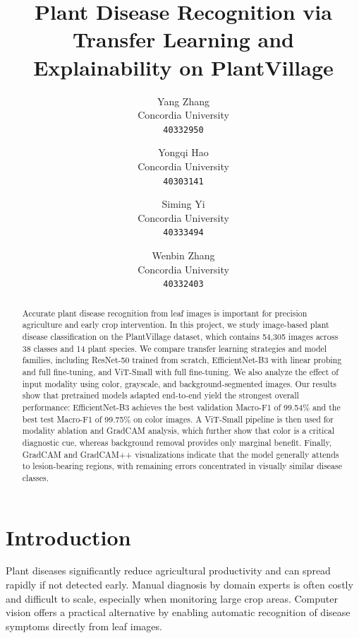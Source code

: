 \documentclass[10pt,twocolumn,letterpaper]{article}
\begin{document}
\title{Plant Disease Recognition via Transfer Learning and Explainability on PlantVillage}

\author{
Yang Zhang\\
Concordia University\\
{\tt\small 40332950}
\and
Yongqi Hao\\
Concordia University\\
{\tt\small 40303141}
\and
Siming Yi\\
Concordia University\\
{\tt\small 40333494}
\and
Wenbin Zhang\\
Concordia University\\
{\tt\small 40332403}
}

\maketitle

\begin{abstract}
Accurate plant disease recognition from leaf images is important for precision agriculture and early crop intervention. In this project, we study image-based plant disease classification on the PlantVillage dataset, which contains 54,305 images across 38 classes and 14 plant species. We compare transfer learning strategies and model families, including ResNet-50 trained from scratch, EfficientNet-B3 with linear probing and full fine-tuning, and ViT-Small with full fine-tuning. We also analyze the effect of input modality using color, grayscale, and background-segmented images. Our results show that pretrained models adapted end-to-end yield the strongest overall performance: EfficientNet-B3 achieves the best validation Macro-F1 of 99.54\% and the best test Macro-F1 of 99.75\% on color images. A ViT-Small pipeline is then used for modality ablation and GradCAM analysis, which further show that color is a critical diagnostic cue, whereas background removal provides only marginal benefit. Finally, GradCAM and GradCAM++ visualizations indicate that the model generally attends to lesion-bearing regions, with remaining errors concentrated in visually similar disease classes.
\end{abstract}

\section{Introduction}

Plant diseases significantly reduce agricultural productivity and can spread rapidly if not detected early. Manual diagnosis by domain experts is often costly and difficult to scale, especially when monitoring large crop areas. Computer vision offers a practical alternative by enabling automatic recognition of disease symptoms directly from leaf images.
\end{document}
